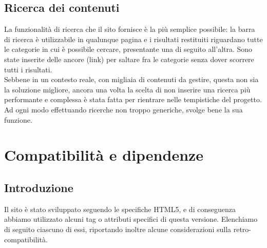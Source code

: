 \documentclass[12pt]{article}
\begin{document}
	\subsection{Ricerca dei contenuti}
	La funzionalità di ricerca che il sito fornisce è la più semplice possibile: la barra di ricerca è utilizzabile in qualunque pagina e i risultati restituiti riguardano tutte le categorie in cui è possibile cercare, presentante una di seguito all'altra. Sono state inserite delle ancore (link) per saltare fra le categorie senza dover scorrere tutti i risultati.\\Sebbene in un contesto reale, con migliaia di contenuti da gestire, questa non sia la soluzione migliore, ancora una volta la scelta di non inserire una ricerca più performante e complessa è stata fatta per rientrare nelle tempistiche del progetto. Ad ogni modo effettuando ricerche non troppo generiche, svolge bene la sua funzione.
	
	\section{Compatibilità e dipendenze}
	\subsection{Introduzione}
	Il sito è stato sviluppato seguendo le specifiche HTML5, e di conseguenza abbiamo utilizzato alcuni tag o attributi specifici di questa versione. Elenchiamo di seguito ciascuno di essi, riportando inoltre alcune considerazioni sulla retro-compatibilità.
	
\end{document}
